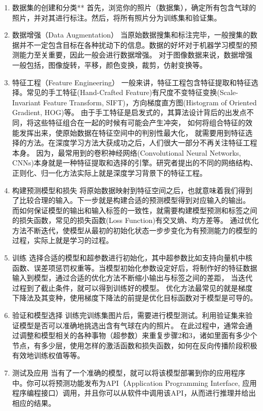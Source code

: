 \documentclass{article}
\begin{document}
  \begin{enumerate}
    \item 数据集的创建和分类** 首先，浏览你的照片（数据集），确定所有包含气球的照片，并对其进行标注。然后，将所有照片分为训练集和验证集。
    
    \item 数据增强（Data Augmentation）
    当原始数据搜集和标注完毕，一般搜集的数据并不一定包含目标在各种扰动下的信息。数据的好坏对于机器学习模型的预测能力至关重要，因此一般会进行数据增强。
    对于图像数据来说，数据增强一般包括，图像旋转，平移，颜色变换，裁剪，仿射变换等。
    
    \item 特征工程（Feature Engineering）
    一般来讲，特征工程包含特征提取和特征选择。常见的手工特征(Hand-Crafted Feature)有尺度不变特征变换(Scale-Invariant Feature Transform, SIFT)，方向梯度直方图(Histogram of Oriented Gradient, HOG)等。
    由于手工特征是启发式的，其算法设计背后的出发点不同，将这些特征组合在一起的时候有可能会产生冲突，
    如何将组合特征的效能发挥出来，使原始数据在特征空间中的判别性最大化，
    就需要用到特征选择的方法。在深度学习方法大获成功之后，人们很大一部分不再关注特征工程本身。
    因为，最常用到的卷积神经网络(Convolutional Neural Networks, CNNs)本身就是一种特征提取和选择的引擎。研究者提出的不同的网络结构、正则化、归一化方法实际上就是深度学习背景下的特征工程。
    
    \item 构建预测模型和损失
    将原始数据映射到特征空间之后，也就意味着我们得到了比较合理的输入。下一步就是构建合适的预测模型得到对应输入的输出。
    而如何保证模型的输出和输入标签的一致性，就需要构建模型预测和标签之间的损失函数，常见的损失函数(Loss Function)有交叉熵、均方差等。
    通过优化方法不断迭代，使模型从最初的初始化状态一步步变化为有预测能力的模型的过程，实际上就是学习的过程。
    
    \item 训练
    选择合适的模型和超参数进行初始化，其中超参数比如支持向量机中核函数、误差项惩罚权重等。当模型初始化参数设定好后，将制作好的特征数据输入到模型，通过合适的优化方法不断缩小输出与标签之间的差距，
    当迭代过程到了截止条件，就可以得到训练好的模型。
    优化方法最常见的就是梯度下降法及其变种，使用梯度下降法的前提是优化目标函数对于模型是可导的。
    
    \item 验证和模型选择
    训练完训练集图片后，需要进行模型测试。利用验证集来验证模型是否可以准确地挑选出含有气球在内的照片。 	
    在此过程中，通常会通过调整和模型相关的各种事物（超参数）来重复步骤2和3，诸如里面有多少个节点，有多少层，使用怎样的激活函数和损失函数，如何在反向传播阶段积极有效地训练权值等等。
    
    \item 测试及应用
    当有了一个准确的模型，就可以将该模型部署到你的应用程序中。你可以将预测功能发布为API（Application Programming Interface, 应用程序编程接口）调用，并且你可以从软件中调用该API，从而进行推理并给出相应的结果。
    
  \end{enumerate}
\end{document}
